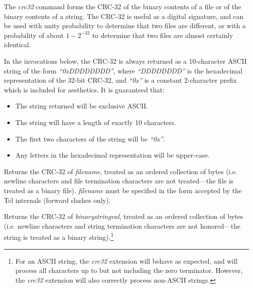 \begin{tclcommanddescription}
The \emph{crc32} command forms the CRC-32 of the binary contents of a file
or of the binary contents of a string.  The CRC-32 is useful as a digital
signature, and can be used with unity probability to determine that two
files are different, or with a probability of about $1-2^{-32}$ to determine
that two files are almost certainly identical.  

In the invocations below, the CRC-32 is always returned as a 10-character ASCII string
of the form \emph{``0xDDDDDDDD''}, where \emph{``DDDDDDDD''} is the hexadecimal representation
of the 32-bit CRC-32, and \emph{``0x''} is a constant 2-character prefix which is included for
aesthetics.  It is guaranteed that:

\begin{itemize}
\item The string returned will be exclusive ASCII.
\item The string will have a length of exactly 10 characters.
\item The first two characters of the string will be \emph{``0x''}.
\item Any letters in the hexadecimal representation will be upper-case.
\end{itemize}

\begin{tclcommandinternaldescription}{}
Returns the CRC-32 of \emph{filename}, treated as an ordered collection of bytes (i.e.
newline characters and file termination characters are not treated---the file is 
treated as a binary file).  \emph{filename} must be specified in the form accepted by
the Tcl internals (forward slashes only).
\end{tclcommandinternaldescription}

\begin{tclcommandinternaldescription}{}
Returns the CRC-32 of \emph{binarystringval}, treated as an ordered collection of bytes (i.e.
newline characters and string termination characters are not honored---the string is 
treated as a binary string).\footnote{For an ASCII string, the \emph{crc32} extension will
behave as expected, and will process all characters up to but not including the zero
terminator.  However, the \emph{crc32} extension will also correctly process non-ASCII strings.}
\end{tclcommandinternaldescription}






\end{tclcommanddescription}
